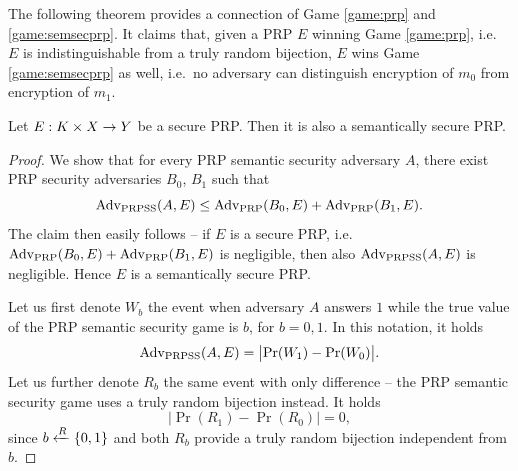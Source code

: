 
The following theorem provides a connection of Game \ref{game:prp} and \ref{game:semsecprp}. It claims that, given a PRP $E$ winning Game \ref{game:prp}, i.e.\ $E$ is indistinguishable from a truly random bijection, $E$ wins Game \ref{game:semsecprp} as well, i.e.\ no adversary can distinguish encryption of $m_0$ from encryption of $m_1$.

\begin{thm}
\label{thm:semsecprp}
	Let $E: K\times X\rightarrow Y$ be a secure PRP. Then it is also a semantically secure PRP.
\end{thm}
\begin{proof}
	We show that for every PRP semantic security adversary $A$, there exist PRP security adversaries $B_0$, $B_1$ such that
	\begin{equation}
	\label{eq:aleqbb}
		\operatorname*{Adv_{PRPSS}}(A,E) \leq \operatorname*{Adv_{PRP}}(B_0,E) + \operatorname*{Adv_{PRP}}(B_1,E) .
	\end{equation}
	The claim then easily follows -- if $E$ is a secure PRP, i.e.\ $\operatorname*{Adv_{PRP}}(B_0,E) + \operatorname*{Adv_{PRP}}(B_1,E)$ is negligible, then also $\operatorname*{Adv_{PRPSS}}(A,E)$ is negligible. Hence $E$ is a semantically secure PRP.
	
	Let us first denote $W_b$ the event when adversary $A$ answers $1$ while the true value of the PRP semantic security game is $b$, for $b=0,1$. In this notation, it holds
	\begin{equation}
	\label{eq:prpssae}
		\operatorname*{Adv_{PRPSS}}(A,E) = \bigl| \Pr(W_1) - \Pr(W_0) \bigr| .
	\end{equation}
	Let us further denote $R_b$ the same event with only difference -- the PRP semantic security game uses a truly random bijection instead. It holds
	\begin{equation}
	\label{eq:rr0}
		\bigl| \Pr(R_1) - \Pr(R_0) \bigr| = 0 ,
	\end{equation}
	since $b\xleftarrow{R}\{0,1\}$ and both $R_b$ provide a truly random bijection independent from $b$.
	

\end{proof}
